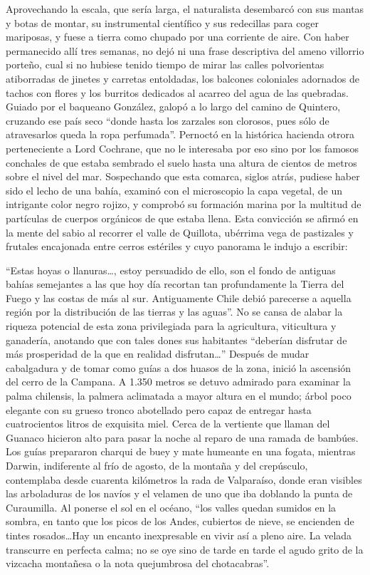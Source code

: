 \documentclass[10pt,twoside,openright]{memoir}
\begin{document}
Aprovechando la escala, que sería
larga, el naturalista desembarcó con sus mantas y botas de montar, su
instrumental científico y sus redecillas para coger mariposas, y fuese a
tierra como chupado por una corriente de aire. Con haber permanecido
allí  tres semanas, no dejó ni una
frase descriptiva del ameno villorrio porteño, cual si no hubiese tenido
tiempo de mirar las calles polvorientas atiborradas de jinetes y
carretas entoldadas, los balcones coloniales adornados de tachos con
flores y los burritos dedicados al acarreo del agua de las quebradas.
Guiado por el baqueano González, galopó a lo largo del camino de
Quintero, cruzando ese país seco ``donde hasta los zarzales son clorosos,
pues sólo de atravesarlos queda la ropa perfumada''. Pernoctó en la
histórica hacienda otrora perteneciente a Lord Cochrane, que no le
interesaba por eso sino por los famosos conchales de que estaba sembrado
el suelo hasta una altura de cientos de metros sobre el nivel del mar.
Sospechando que esta comarca, siglos atrás,
pudiese haber sido el lecho de una
bahía, examinó con el microscopio la capa vegetal, de un intrigante
color negro rojizo, y comprobó su formación marina por la multitud de
partículas de cuerpos orgánicos de que estaba llena. Esta convicción se
afirmó en la mente del sabio al recorrer el valle de Quillota, ubérrima
vega de pastizales y frutales encajonada entre cerros estériles y cuyo
panorama le indujo a escribir:

``Estas hoyas o llanuras\ldots, estoy persuadido de ello,
son el fondo de antiguas bahías
semejantes a las que hoy día recortan tan profundamente la Tierra del
Fuego y las costas de más al sur. Antiguamente Chile debió parecerse a
aquella región por la distribución de las tierras y las aguas''. No se
cansa de alabar la riqueza potencial de esta zona privilegiada para la
agricultura, viticultura y ganadería, anotando que con tales dones sus
habitantes ``deberían disfrutar de más prosperidad de la que en realidad
disfrutan\ldots'' Después de mudar cabalgadura y de tomar como guías a dos
huasos de la zona, inició la ascensión del cerro de la Campana. A 1.350
metros se detuvo admirado para examinar la palma chilensis, la palmera
aclimatada a mayor altura en el mundo; árbol poco elegante con su grueso
tronco abotellado pero capaz de
entregar hasta cuatrocientos litros de exquisita
miel. Cerca de la vertiente que
llaman del Guanaco hicieron alto para pasar la noche al reparo de una
ramada de bambúes. Los guías prepararon charqui de buey y mate humeante
en una fogata, mientras Darwin, indiferente al frío de agosto, de la
montaña y del crepúsculo,
contemplaba desde cuarenta kilómetros la rada de Valparaíso, donde eran
visibles las arboladuras de los navíos y el velamen de uno que iba
doblando la punta de Curaumilla. Al ponerse el sol en el océano, ``los
valles quedan sumidos en la sombra, en tanto que los picos de los Andes,
cubiertos de nieve, se encienden de tintes rosados\ldots Hay un encanto
inexpresable en vivir así a pleno aire. La velada transcurre en perfecta
calma; no se oye sino de tarde en tarde el agudo grito de la vizcacha
montañesa o la nota quejumbrosa del chotacabras''.
\end{document}
